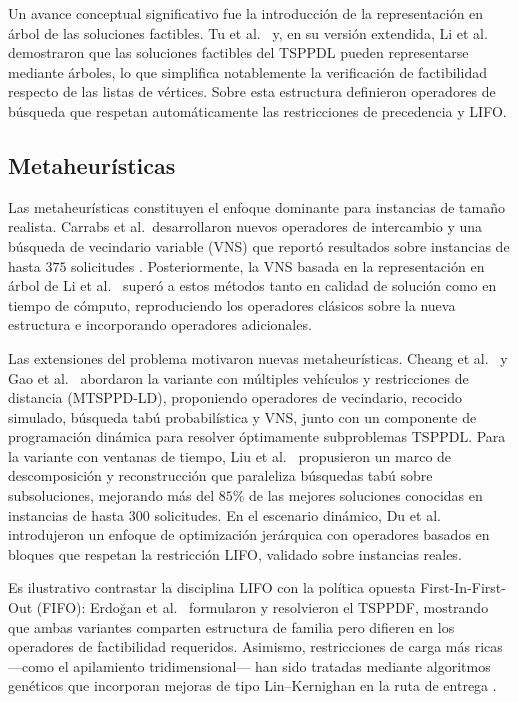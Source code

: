 \documentclass[conference]{IEEEtran}
\begin{document}
Un avance conceptual significativo fue la introducción de la representación en árbol de las soluciones factibles. Tu et al.\ \cite{tu2010} y, en su versión extendida, Li et al.\ \cite{li2011} demostraron que las soluciones factibles del TSPPDL pueden representarse mediante árboles, lo que simplifica notablemente la verificación de factibilidad respecto de las listas de vértices. Sobre esta estructura definieron operadores de búsqueda que respetan automáticamente las restricciones de precedencia y LIFO.

\subsection{Metaheurísticas}
Las metaheurísticas constituyen el enfoque dominante para instancias de tamaño realista. Carrabs et al.\ desarrollaron nuevos operadores de intercambio y una búsqueda de vecindario variable (VNS) que reportó resultados sobre instancias de hasta $375$ solicitudes \cite{cordeau2010,li2011}. Posteriormente, la VNS basada en la representación en árbol de Li et al.\ \cite{li2011} superó a estos métodos tanto en calidad de solución como en tiempo de cómputo, reproduciendo los operadores clásicos sobre la nueva estructura e incorporando operadores adicionales.

Las extensiones del problema motivaron nuevas metaheurísticas. Cheang et al.\ \cite{cheang2012} y Gao et al.\ \cite{gao2011} abordaron la variante con múltiples vehículos y restricciones de distancia (MTSPPD-LD), proponiendo operadores de vecindario, recocido simulado, búsqueda tabú probabilística y VNS, junto con un componente de programación dinámica para resolver óptimamente subproblemas TSPPDL. Para la variante con ventanas de tiempo, Liu et al.\ \cite{liu2019} propusieron un marco de descomposición y reconstrucción que paraleliza búsquedas tabú sobre subsoluciones, mejorando más del $85\%$ de las mejores soluciones conocidas en instancias de hasta $300$ solicitudes. En el escenario dinámico, Du et al.\ \cite{du2023} introdujeron un enfoque de optimización jerárquica con operadores basados en bloques que respetan la restricción LIFO, validado sobre instancias reales.

Es ilustrativo contrastar la disciplina LIFO con la política opuesta First-In-First-Out (FIFO): Erdo\u{g}an et al.\ \cite{erdogan2009} formularon y resolvieron el TSPPDF, mostrando que ambas variantes comparten estructura de familia pero difieren en los operadores de factibilidad requeridos. Asimismo, restricciones de carga más ricas —como el apilamiento tridimensional— han sido tratadas mediante algoritmos genéticos que incorporan mejoras de tipo Lin--Kernighan en la ruta de entrega \cite{ruan2021}.
\end{document}
